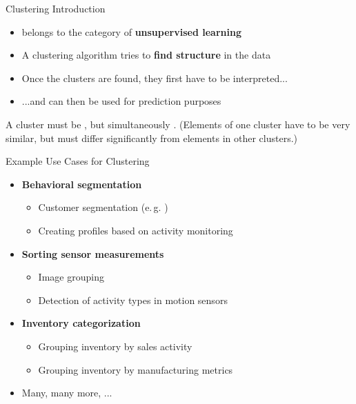 \begin{frame}{Clustering Introduction}{}
	\begin{itemize}
		\item {} belongs to the category of \textbf{unsupervised learning}
		\item A clustering algorithm tries to \textbf{find structure} in the data
		\item Once the clusters are found, they first have to be interpreted...
		\item ...and can then be used for prediction purposes
	\end{itemize}
	
	\vspace*{3mm}
	\begin{boxBlueNoFrame}
		\footnotesize
		A cluster must be , but simultaneously .
		(Elements of one cluster have to be very similar, but must differ significantly from elements in other clusters.)
	\end{boxBlueNoFrame}
\end{frame}


\begin{frame}{Example Use Cases for Clustering}{}
	\begin{itemize}
		\item \textbf{Behavioral segmentation}
		\begin{itemize}
			\item Customer segmentation (e.\,g. )
			\item Creating profiles based on activity monitoring
		\end{itemize}
		\item \textbf{Sorting sensor measurements}
		\begin{itemize}
			\item Image grouping
			\item Detection of activity types in motion sensors
		\end{itemize}
		\item \textbf{Inventory categorization}
		\begin{itemize}
			\item Grouping inventory by sales activity
			\item Grouping inventory by manufacturing metrics
		\end{itemize}
		\item Many, many more, ...
	\end{itemize}
\end{frame}


